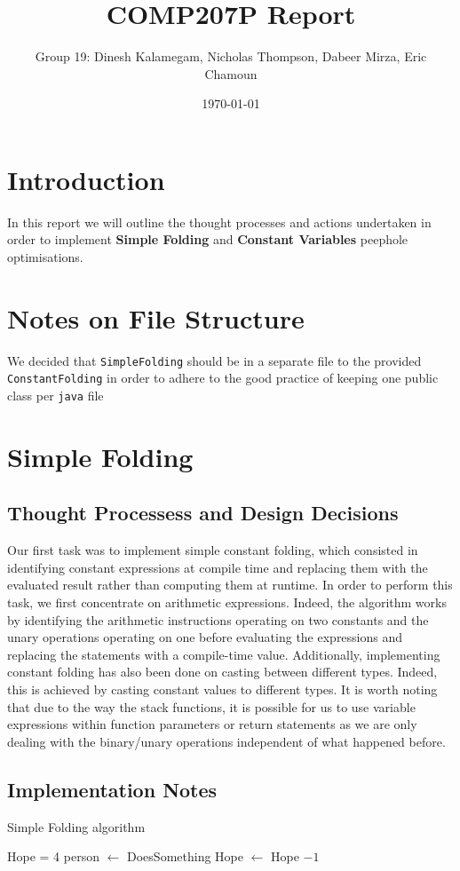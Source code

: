 \documentclass[11pt]{article}
\begin{document}
\title{COMP207P Report}
\author{Group 19: Dinesh Kalamegam, Nicholas Thompson, Dabeer Mirza, Eric Chamoun}
\date{\today}
\maketitle

\section{Introduction}
In this report we will outline the thought processes and actions undertaken in order to implement \textbf{Simple Folding} and \textbf{Constant Variables} peephole optimisations.

\section{Notes on File Structure}
We decided that \texttt{SimpleFolding} should be in a separate file to the provided \texttt{ConstantFolding} in order to adhere to the good practice of keeping one public class per \texttt{java} file

\section{Simple Folding}
\subsection{Thought Processess and Design Decisions}

Our first task was to implement simple constant folding, which consisted in identifying constant expressions at compile time and replacing them with the evaluated result rather than computing them at runtime.
In order to perform this task, we first concentrate on arithmetic expressions. Indeed, the algorithm works by identifying the arithmetic instructions operating on two constants and the unary operations operating on one before evaluating the expressions and replacing the statements with a compile-time value.
Additionally, implementing constant folding has also been done on casting between different types. Indeed, this is achieved by casting constant values to different types.
It is worth noting that due to the way the stack functions, it is possible for us to use variable expressions within function parameters or return statements as we are only dealing with the binary/unary operations independent of what happened before.


\subsection{Implementation Notes}
\begin{algorithm}[H]
\caption{Simple Folding algorithm}
\begin{algorithmic}[1]
    \State Hope = 4
    \State person $\gets$ DoesSomething
    \Else
    \State Hope $\gets$ Hope $-1$
    \EndIf
    \EndWhile
\end{algorithmic}
\end{algorithm}
\end{document}
